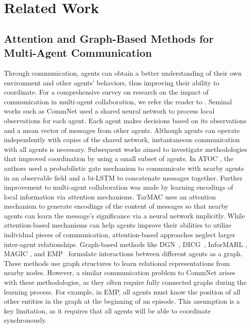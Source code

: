 \section{Related Work}
\subsection{Attention and Graph-Based Methods for Multi-Agent Communication} 
Through communication, agents can obtain a better understanding of their own environment and other agents' behaviors, thus improving their ability to coordinate. For a comprehensive survey on research on the impact of communication in multi-agent collaboration, we refer the reader to \cite{comm_survey}. Seminal works such as CommNet \cite{CommNet} used a shared neural network to process local observations for each agent. Each agent makes decisions based on its observations and a mean vector of messages from other agents. Although agents can operate independently with copies of the shared network, instantaneous communication with all agents is necessary. Subsequent works \cite{IC3Net, ATOC} aimed to investigate methodologies that improved coordination by using a small subset of agents. In ATOC \cite{ATOC}, the authors used a probabilistic gate mechanism to communicate with nearby agents in an observable field and a bi-LSTM to concatenate messages together. Further improvement to multi-agent collaboration was made by learning encodings of local information via attention mechanisms. TarMAC \cite{TarMAC} uses an attention mechanism to generate encodings of the content of messages so that nearby agents can learn the message's significance via a neural network implicitly. While attention-based mechanisms can help agents improve their abilities to utilize individual pieces of communication, attention-based approaches neglect larger inter-agent relationships. Graph-based methods like DGN~\cite{DGN}, DICG~\cite{DICG}, InforMARL \cite{informarl_icml}, MAGIC \cite{magic}, and EMP~\cite{EMP} formulate interactions between different agents as a graph. These methods use graph structures to learn relational representations from nearby nodes. However, a similar communication problem to CommNet arises with these methodologies, as they often require fully connected graphs during the learning process.  For example, in EMP, all agents must know the position of all other entities in the graph at the beginning of an episode. This assumption is a key limitation, as it requires that all agents will be able to coordinate synchronously.


